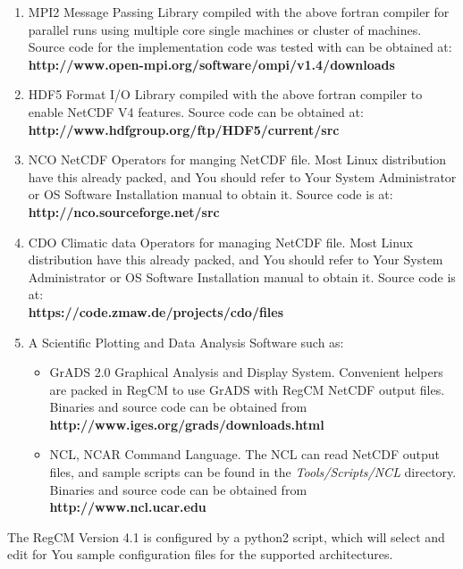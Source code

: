 \begin{enumerate}
\item MPI2 Message Passing Library compiled with the above fortran compiler
for parallel runs using multiple core single machines or cluster of machines.
Source code for the implementation code was tested with can be obtained at: \\
{\bf http://www.open-mpi.org/software/ompi/v1.4/downloads}
\item HDF5 Format I/O Library compiled with the above fortran compiler to
enable NetCDF V4 features. Source code can be obtained at: \\
{\bf http://www.hdfgroup.org/ftp/HDF5/current/src}
\item NCO NetCDF Operators for manging NetCDF file. Most Linux distribution
have this already packed, and You should refer to Your System Administrator or
OS Software Installation manual to obtain it. Source code is at: \\
{\bf http://nco.sourceforge.net/src}
\item CDO Climatic data Operators for managing NetCDF file. Most Linux
distribution have this already packed, and You should refer to Your System
Administrator or OS Software Installation manual to obtain it.
Source code is at: \\
{\bf https://code.zmaw.de/projects/cdo/files}
\item A Scientific Plotting and Data Analysis Software such as:
\begin{itemize}
\item GrADS 2.0 Graphical Analysis and Display System. Convenient helpers
are packed in RegCM to use GrADS with RegCM NetCDF output files.
Binaries and source code can be obtained from \\
{\bf http://www.iges.org/grads/downloads.html}
\item NCL, NCAR Command Language. The NCL can read NetCDF output files, and
sample scripts can be found in the {\em Tools/Scripts/NCL} directory.
Binaries and source code can be obtained from \\
{\bf http://www.ncl.ucar.edu}
\end{itemize}
\end{enumerate}

The RegCM Version 4.1 is configured by a python2 script, which will select
and edit for You sample configuration files for the supported architectures.
